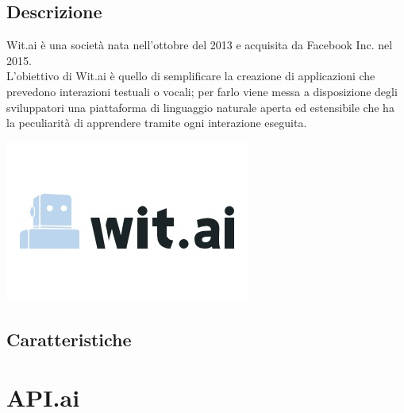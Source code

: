 \documentclass[a4paper,titlepage]{article}
\begin{document}
	\subsection{Descrizione}
		\begin{minipage}{0.7\textwidth}\raggedright
			Wit.ai è una società nata nell'ottobre del 2013 e acquisita da Facebook Inc. nel 2015. \\
			L'obiettivo di Wit.ai è quello di semplificare la creazione di applicazioni che prevedono interazioni testuali o vocali; per farlo viene messa a disposizione degli sviluppatori una piattaforma di linguaggio naturale aperta ed estensibile che ha la peculiarità di apprendere tramite ogni interazione eseguita.
		\end{minipage}
		\hfill
		\noindent\begin{minipage}{0.15\textwidth}
		\includegraphics[scale=0.6]{images/witai.jpg}
		\end{minipage}
	\subsection{Caratteristiche}
		

\section{API.ai}
\end{document}
